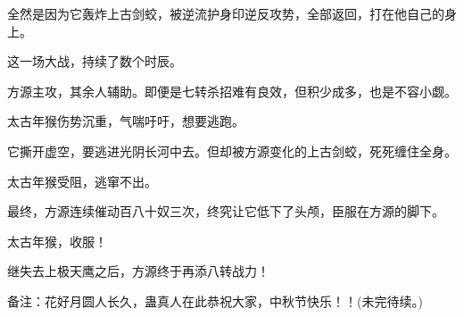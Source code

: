 \begin{this_body}
全然是因为它轰炸上古剑蛟，被逆流护身印逆反攻势，全部返回，打在他自己的身上。

这一场大战，持续了数个时辰。

方源主攻，其余人辅助。即便是七转杀招难有良效，但积少成多，也是不容小觑。

太古年猴伤势沉重，气喘吁吁，想要逃跑。

它撕开虚空，要逃进光阴长河中去。但却被方源变化的上古剑蛟，死死缠住全身。

太古年猴受阻，逃窜不出。

最终，方源连续催动百八十奴三次，终究让它低下了头颅，臣服在方源的脚下。

太古年猴，收服！

继失去上极天鹰之后，方源终于再添八转战力！

备注：花好月圆人长久，蛊真人在此恭祝大家，中秋节快乐！！(未完待续。)

\end{this_body}

